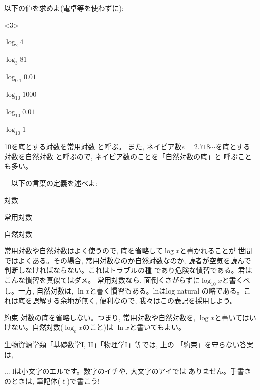 \begin{q}\label{q:exp_logvalue0} 以下の値を求めよ(電卓等を使わずに):
\begin{edaenumerate}<3>
\item $\log_2 4$
\item $\log_{3} 81$
\item $\log_{0.1} 0.01$
\item $\log_{10} 1000$
\item $\log_{10} 0.01$
\item $\log_{10} 1$
\end{edaenumerate}\end{q}
\hv

10を底とする対数を\underline{常用対数} と呼ぶ。
また, ネイピア数$e=2.718\cdots$を底とする対数を\underline{自然対数} 
と呼ぶので, ネイピア数のことを「自然対数の底」と
呼ぶことも多い。

\begin{q}\label{q:whatis_log}　以下の言葉の定義を述べよ:
\begin{edaenumerate}
\item 対数
\item 常用対数 
\item 自然対数
\end{edaenumerate}
\end{q}

常用対数や自然対数はよく使うので, 底を省略して$\log x$と書かれることが
世間ではよくある。その場合, 常用対数なのか自然対数なのか, 
読者が空気を読んで判断しなければならない。これはトラブルの種
であり危険な慣習である。君はこんな慣習を真似てはダメ。
常用対数なら, 面倒くさがらずに$\log_{10}x$と書くべし。一方, 
自然対数は, $\ln x$と書く慣習もある。lnはlog natural
の略である。これは底を誤解する余地が無く, 便利なので, 我々はこの表記を採用しよう。
\begin{itembox}{約束}
対数の底を省略しない。つまり, 常用対数や自然対数を, 
$\log x$と書いてはいけない。自然対数($\log_e x$のこと)は
$\ln x$と書いてもよい。
\end{itembox}

生物資源学類「基礎数学I, II」「物理学I」等では, 上の
「約束」を守らない答案は, 

\begin{freqmiss}{\small{} ...
lは小文字のエルです。数字のイチや, 大文字のアイでは
ありません。手書きのときは, 筆記体($\ell$)で書こう!}\end{freqmiss}

